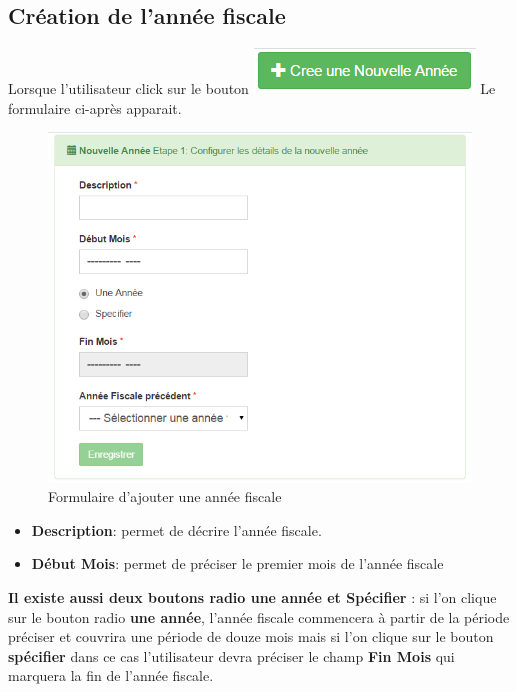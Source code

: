 \documentclass[12pt,a4paper]{report}
\begin{document}
\newpage
\subsection{Création de l'année fiscale}
Lorsque l'utilisateur click sur le bouton \includegraphics[scale=0.7]{pic/CreeAnnFisc.png} Le formulaire ci-après apparait.

\begin{figure}[h]
\begin{center}
\includegraphics[width=12cm]{pic/FormCreationAnnFisc.png}
\end{center}
\caption{Formulaire d'ajouter une année fiscale}
\label{Formulaire d'ajouter une année fiscale}
\end{figure}
\begin{itemize}
\item \textbf{Description}: permet de décrire l'année fiscale.
\item \textbf{Début Mois}: permet de préciser le premier mois de l'année fiscale
\end{itemize}
\textbf{Il existe aussi deux boutons radio une année et Spécifier }: si l'on clique sur le bouton radio \textbf{une année}, l'année fiscale commencera à partir de la période préciser et couvrira une période de douze mois mais si l'on clique sur le bouton \textbf{spécifier} dans ce cas l'utilisateur devra préciser le champ \textbf{Fin Mois} qui marquera la fin de l'année fiscale.
\end{document}
